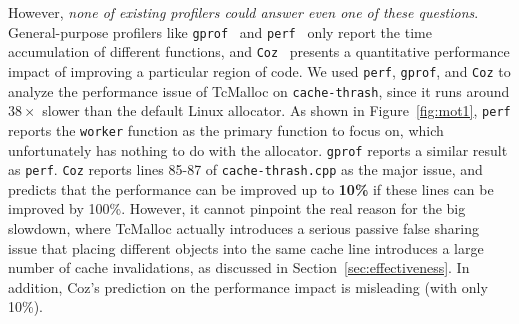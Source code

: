 However, \textit{none of existing profilers could answer even one of these questions}. General-purpose profilers like \texttt{gprof}~\cite{DBLP:conf/sigplan/GrahamKM82} and \texttt{perf}~\cite{perf} only report the time accumulation of different functions, and \texttt{Coz}~\cite{Coz} presents a quantitative performance impact of improving a particular region of code. We used \texttt{perf}, \texttt{gprof}, and \texttt{Coz} to analyze the performance issue of TcMalloc on \texttt{cache-thrash}, since it runs around $38\times$ slower than the default Linux allocator. As shown in Figure~\ref{fig:mot1}, \texttt{perf} reports the \texttt{worker} function as the primary function to focus on, which unfortunately has nothing to do with the allocator. \texttt{gprof} reports a similar result as \texttt{perf}. \texttt{Coz} reports lines 85-87 of \texttt{cache-thrash.cpp} as the major issue, and predicts that the performance can be improved up to \textbf{10\%} if these lines can be improved by 100\%. However, it cannot pinpoint the real reason for the big slowdown, where TcMalloc actually introduces a serious passive false sharing issue that placing different objects into the same cache line introduces a large number of cache invalidations, as discussed in Section~\ref{sec:effectiveness}. In addition, Coz's prediction on the performance impact is misleading (with only 10\%).


